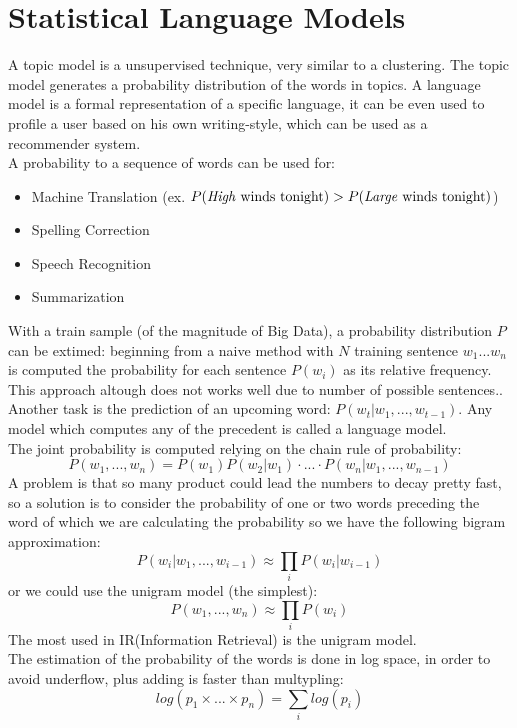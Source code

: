 \documentclass[11pt, a4page]{article}
\begin{document}
\section{Statistical Language Models}
A topic model is a unsupervised technique, very similar to a clustering.
The topic model generates a probability distribution of the words in topics.
A language model is a formal representation of a specific language, it can be even used to profile a user based on his own writing-style, which can be used as a recommender system.\\
A probability to a sequence of words can be used for:
\begin{itemize}[noitemsep]
\item Machine Translation (ex. $P(\text{\textit{High} winds tonight}) > P(\text{\textit{Large} winds tonight})$)
\item Spelling Correction
\item Speech Recognition
\item Summarization
\end{itemize}
With a train sample (of the magnitude of Big Data), a probability distribution $P$ can be extimed: beginning from a naive method with $N$ training sentence $w_1 ... w_n$ is computed the probability for each sentence $P(w_i)$ as its relative frequency.
This approach altough does not works well due to number of possible sentences..
Another task is the prediction of an upcoming word: $P(w_t|w_1,..., w_{t-1})$.
Any model which computes any of the precedent is called a language model.\\
The joint probability is computed relying on the chain rule of probability:
\begin{equation*}
P(w_1,...,w_n) =P(w_1)P(w_2|w_1)\cdot ...\cdot P(w_n|w_1,...,w_{n-1})  
\end{equation*}
A problem is that so many product could lead the numbers to decay pretty fast, so a solution is to consider the probability of one or two words preceding the word of which we are calculating the probability so we have the following bigram approximation:
$$ P(w_i|w_1,...,w_{i-1}) \approx \prod_i P(w_i|w_{i-1}) $$
or we could use the unigram model (the simplest):
$$ P(w_1,...,w_n) \approx \prod_i P(w_i) $$
The most used in IR(Information Retrieval) is the unigram model.
\\
The estimation of the probability of the words is done in log space, in order to avoid underflow, plus adding is faster than multypling:
$$log(p_1 \times ... \times p_n) = \sum_i log(p_i)$$
\end{document}
